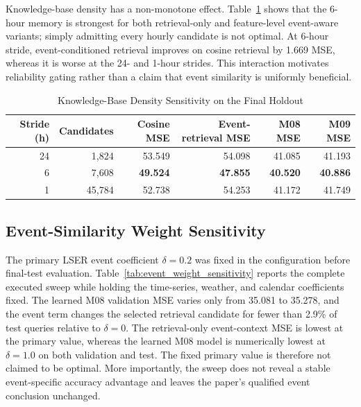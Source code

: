 \documentclass{ieeeaccess}
\begin{document}
Knowledge-base density has a non-monotone effect. Table~\ref{tab:stride_sweep}
shows that the 6-hour memory is strongest for both retrieval-only and
feature-level event-aware variants; simply admitting every hourly candidate is
not optimal. At 6-hour stride, event-conditioned retrieval improves on cosine
retrieval by 1.669 MSE, whereas it is worse at the 24- and 1-hour strides. This
interaction motivates reliability gating rather than a claim that event
similarity is uniformly beneficial.

\begin{table}[!t]
\centering
\caption{Knowledge-Base Density Sensitivity on the Final Holdout}
\label{tab:stride_sweep}
\begin{tabular}{rrrrrr}
\toprule
Stride (h) & Candidates & Cosine MSE & Event-retrieval MSE & M08 MSE & M09 MSE \\
\midrule
24 & 1,824 & 53.549 & 54.098 & 41.085 & 41.193 \\
6 & 7,608 & \textbf{49.524} & \textbf{47.855} & \textbf{40.520} & \textbf{40.886} \\
1 & 45,784 & 52.738 & 54.253 & 41.172 & 41.749 \\
\bottomrule
\end{tabular}
\end{table}

\subsection{Event-Similarity Weight Sensitivity}
\label{sec:event_weight_sensitivity}
The primary LSER event coefficient $\delta=0.2$ was fixed in the configuration
before final-test evaluation. Table~\ref{tab:event_weight_sensitivity} reports
the complete executed sweep while holding the time-series, weather, and calendar
coefficients fixed. The learned M08 validation MSE varies only from 35.081 to
35.278, and the event term changes the selected retrieval candidate for fewer
than 2.9\% of test queries relative to $\delta=0$. The retrieval-only
event-context MSE is lowest at the primary value, whereas the learned M08 model
is numerically lowest at $\delta=1.0$ on both validation and test. The fixed
primary value is therefore not claimed to be optimal. More importantly, the
sweep does not reveal a stable event-specific accuracy advantage and leaves the
paper's qualified event conclusion unchanged.
\end{document}
